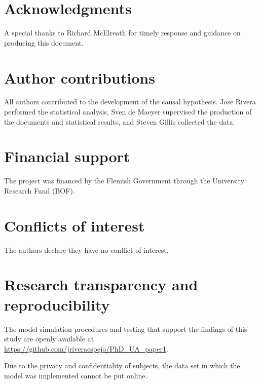 \section{Acknowledgments}
A special thanks to Richard McElreath for timely response and guidance on producing this document.

\section{Author contributions}
All authors contributed to the development of the causal hypothesis. Jose Rivera performed the statistical analysis, Sven de Maeyer supervised the production of the documents and statistical results, and Steven Gillis collected the data.
%
%
\section{Financial support}
%
The project was financed by the Flemish Government through the University Research Fund (BOF).
%
%
\section{Conflicts of interest}
The authors declare they have no conflict of interest.
%
%
\section{Research transparency and reproducibility}
The model simulation procedures and testing that support the findings of this study are openly available at \url{https://github.com/jriveraespejo/PhD_UA_paper1}.

Due to the privacy and confidentiality of subjects, the data set in which the model was implemented cannot be put online.
%
%